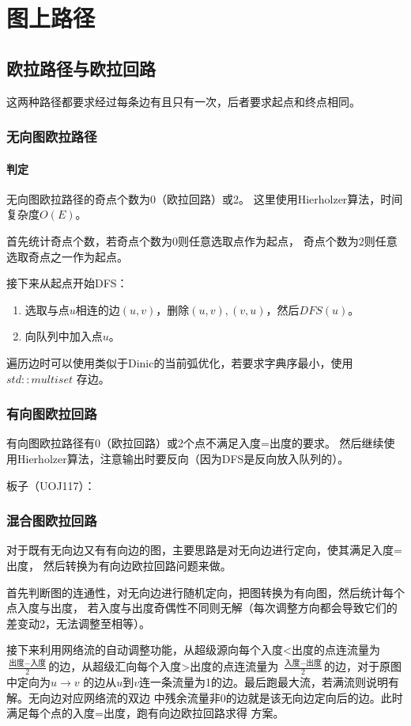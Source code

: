 \section{图上路径}
\subsection{欧拉路径与欧拉回路}
这两种路径都要求经过每条边有且只有一次，后者要求起点和终点相同。
\subsubsection{无向图欧拉路径}
\paragraph{判定} 无向图欧拉路径的奇点个数为0（欧拉回路）或2。
这里使用Hierholzer算法，时间复杂度$O(E)$。

首先统计奇点个数，若奇点个数为0则任意选取点作为起点，
奇点个数为2则任意选取奇点之一作为起点。

接下来从起点开始DFS：
\begin{enumerate}
    \item 选取与点$u$相连的边$(u,v)$，删除$(u,v),(v,u)$，然后$DFS(u)$。
    \item 向队列中加入点$u$。
\end{enumerate}
遍历边时可以使用类似于Dinic的当前弧优化，若要求字典序最小，使用$std::multiset$
存边。
\subsubsection{有向图欧拉回路}
有向图欧拉路径有0（欧拉回路）或2个点不满足入度=出度的要求。
然后继续使用Hierholzer算法，注意输出时要反向（因为DFS是反向放入队列的）。

板子（UOJ117）：

\subsubsection{混合图欧拉回路}
对于既有无向边又有有向边的图，主要思路是对无向边进行定向，使其满足入度=出度，
然后转换为有向边欧拉回路问题来做。

首先判断图的连通性，对无向边进行随机定向，把图转换为有向图，然后统计每个点入度与出度，
若入度与出度奇偶性不同则无解（每次调整方向都会导致它们的差变动2，无法调整至相等）。

接下来利用网络流的自动调整功能，从超级源向每个入度<出度的点连流量为
$\frac{\textrm{出度}-\textrm{入度}}{2}$的边，从超级汇向每个入度>出度的点连流量为
$\frac{\textrm{入度}-\textrm{出度}}{2}$的边，对于原图中定向为$u\rightarrow v$
的边从$u$到$v$连一条流量为1的边。最后跑最大流，若满流则说明有解。无向边对应网络流的双边
中残余流量非0的边就是该无向边定向后的边。此时满足每个点的入度=出度，跑有向边欧拉回路求得
方案。

